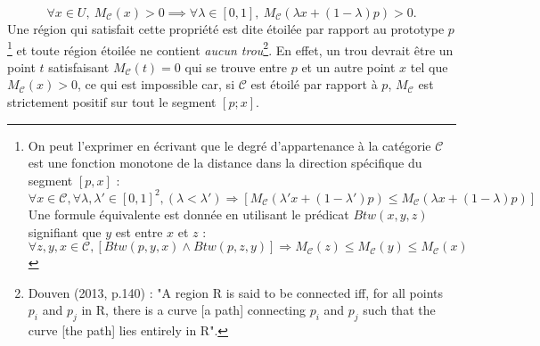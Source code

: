 \documentclass{article}
\begin{document}
\[
\forall x \in U, \ M_{\mathcal{C}}(x) > 0 \implies \forall \lambda \in \left[0,1\right], \ M_{\mathcal{C}}(\lambda x + (1 - \lambda)p) > 0.
\]
Une région qui satisfait cette propriété est dite étoilée par rapport au prototype $p$\footnote{On peut l'exprimer en écrivant que le degré d'appartenance à la catégorie \(\mathcal{C}\) est une fonction monotone de la distance dans la direction spécifique du segment \([p,x]\) :
\vspace{-0.5em}
\begin{equation*}
\forall x \in \mathcal{C}, \forall \lambda, \lambda' \in \left[0,1\right]^2, (\lambda < \lambda') \Rightarrow \left[ M_{\mathcal{C}}(\lambda' x + (1 - \lambda') p) \leq M_{\mathcal{C}}(\lambda x + (1 - \lambda) p) \right]
\end{equation*}
\vspace{-0.5em}
\noindent Une formule équivalente est donnée en utilisant le prédicat \(Btw(x, y, z)\) signifiant que \(y\) est entre \(x\) et \(z\) :
\vspace{-0.5em}
\begin{equation*}
\forall z, y, x \in \mathcal{C}, \left[ Btw(p, y, x) \land Btw(p, z, y) \right] \Rightarrow M_{\mathcal{C}}(z) \leq M_{\mathcal{C}}(y) \leq M_{\mathcal{C}}(x)
\end{equation*}
\vspace{-1em}
} et toute région étoilée ne contient \textit{aucun trou}\footnote{Douven (2013, p.140) : "A region R is said to be connected iff, for all points \(p_i\)  and \(p_j\) in R, there is a curve [a path] connecting \(p_i\)  and \(p_j\) such that the curve [the path] lies entirely in R".}. En effet, un trou devrait être un point \( t \) satisfaisant \( M_{\mathcal{C}}(t)=0 \) qui se trouve entre \( p \) et un autre point \( x \) tel que \( M_{\mathcal{C}}(x)>0 \), ce qui est impossible car, si $\mathcal{C}$ est étoilé par rapport à $p$, \( M_{\mathcal{C}} \) est strictement positif sur tout le segment \(\left[p;x\right]\).
\par
\end{document}
